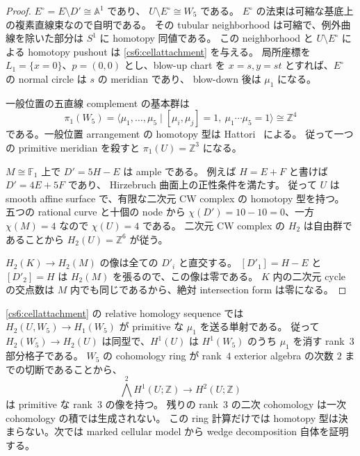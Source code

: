 \begin{proof}
$E^\circ=E\setminus D'\cong\mathbb A^1$ であり、
$U\setminus E^\circ\cong W_5$ である。
$E^\circ$ の法束は可縮な基底上の複素直線束なので自明である。
その tubular neighborhood は可縮で、例外曲線を除いた部分は $S^1$ に homotopy 同値である。
この neighborhood と $U\setminus E^\circ$ による homotopy pushout は
\eqref{cs6:cellattachment} を与える。
局所座標を $L_1=\{x=0\}$、$p=(0,0)$ とし、blow-up chart を
$x=s,y=st$ とすれば、$E^\circ$ の normal circle は $s$ の meridian であり、
blow-down 後は $\mu_1$ になる。

一般位置の五直線 complement の基本群は
\[
 \pi_1(W_5)=\langle\mu_1,\ldots,\mu_5\mid
 [\mu_i,\mu_j]=1,\ \mu_1\cdots\mu_5=1\rangle
 \cong\mathbb Z^4
\]
である。一般位置 arrangement の homotopy 型は Hattori~\cite{Hattori} による。
従って一つの primitive meridian を殺すと $\pi_1(U)=\mathbb Z^3$ になる。

$M\cong\mathbb F_1$ 上で $D'=5H-E$ は ample である。
例えば $H=E+F$ と書けば $D'=4E+5F$ であり、
Hirzebruch 曲面上の正性条件を満たす。
従って $U$ は smooth affine surface で、有限な二次元 CW complex の homotopy 型を持つ。
五つの rational curve と十個の node から
$\chi(D')=10-10=0$、一方 $\chi(M)=4$ なので $\chi(U)=4$ である。
二次元 CW complex の $H_2$ は自由群であることから $H_2(U)=\mathbb Z^6$ が従う。

$H_2(K)\to H_2(M)$ の像は全ての $D'_i$ と直交する。
$[D'_1]=H-E$ と $[D'_2]=H$ は $H_2(M)$ を張るので、この像は零である。
$K$ 内の二次元 cycle の交点数は $M$ 内でも同じであるから、絶対 intersection form は零になる。
\end{proof}

\begin{remark}
\label{cs6:cup}
\eqref{cs6:cellattachment} の relative homology sequence では
$H_2(U,W_5)\to H_1(W_5)$ が primitive な $\mu_1$ を送る単射である。
従って $H_2(W_5)\to H_2(U)$ は同型で、$H^1(U)$ は
$H^1(W_5)$ のうち $\mu_1$ を消す rank~$3$ 部分格子である。
$W_5$ の cohomology ring が rank~$4$ exterior algebra の次数 $2$ までの切断であることから、
\[
 \bigwedge^2 H^1(U;\mathbb Z)\longrightarrow H^2(U;\mathbb Z)
\]
は primitive な rank~$3$ の像を持つ。
残りの rank~$3$ の二次 cohomology は一次 cohomology の積では生成されない。
この ring 計算だけでは homotopy 型は決まらない。次では marked cellular model から wedge decomposition 自体を証明する。
\end{remark}



